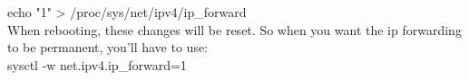 echo "1" > /proc/sys/net/ipv4/ip_forward \\
When rebooting, these changes will be reset. So when you want the ip forwarding to be permanent, you'll have to use: \\
sysctl -w net.ipv4.ip_forward=1